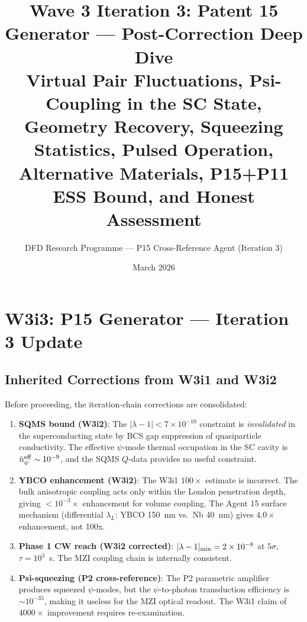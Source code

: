 \documentclass[11pt]{article}
\title{Wave 3 Iteration 3: Patent 15 Generator --- Post-Correction Deep Dive\\
\large Virtual Pair Fluctuations, Psi-Coupling in the SC State,\\
Geometry Recovery, Squeezing Statistics, Pulsed Operation,\\
Alternative Materials, P15+P11 ESS Bound, and Honest Assessment}
\author{DFD Research Programme --- P15 Cross-Reference Agent (Iteration 3)}
\date{March 2026}
\newcommand{\ee}[1]{\times 10^{#1}}
\newcommand{\lam}{\lambda}
\begin{document}
\maketitle

\section*{W3i3: P15 Generator --- Iteration 3 Update}

\subsection*{Inherited Corrections from W3i1 and W3i2}

Before proceeding, the iteration-chain corrections are consolidated:

\begin{enumerate}
\item \textbf{SQMS bound (W3i2)}: The $|\lam-1| < 7\ee{-10}$ constraint is
\emph{invalidated} in the superconducting state by BCS gap suppression of
quasiparticle conductivity. The effective $\psi$-mode thermal occupation
in the SC cavity is $\bar{n}_\psi^{\rm eff} \sim 10^{-9}$, and the SQMS
$Q$-data provides no useful constraint.

\item \textbf{YBCO enhancement (W3i2)}: The W3i1 $100\times$ estimate is
incorrect. The bulk anisotropic coupling acts only within the London penetration
depth, giving $< 10^{-3}\times$ enhancement for volume coupling. The Agent 15
surface mechanism (differential $\lambda_L$: YBCO 150~nm vs.\ Nb 40~nm) gives
$4.0\times$ enhancement, not 100x.

\item \textbf{Phase 1 CW reach (W3i2 corrected)}: $|\lam-1|_{\rm min} = 2\ee{-8}$
at $5\sigma$, $\tau = 10^3$~s. The MZI coupling chain is internally consistent.

\item \textbf{Psi-squeezing (P2 cross-reference)}: The P2 parametric amplifier
produces squeezed $\psi$-modes, but the $\psi$-to-photon transduction efficiency
is $\sim 10^{-35}$, making it useless for the MZI optical readout. The W3i1
claim of $4000\times$ improvement requires re-examination.
\end{enumerate}

\end{document}
